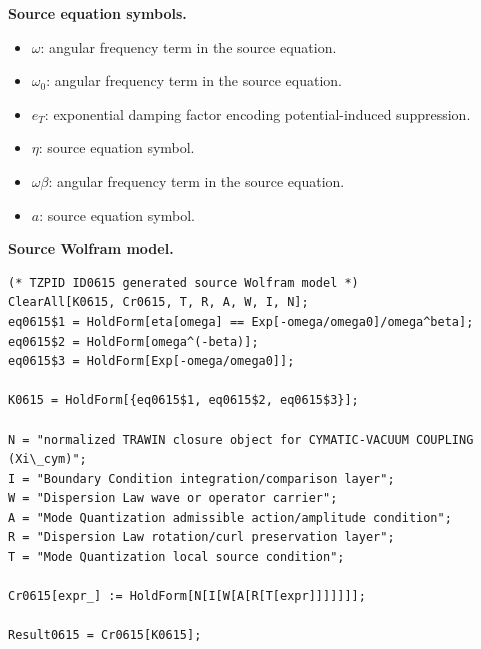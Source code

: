 \begin{minipage}[t]{0.49\linewidth}
\begingroup
\small
\raggedright
\textbf{Source equation symbols.}\par
\begin{itemize}[leftmargin=1.35em,itemsep=1pt,topsep=1pt,parsep=0pt]
    \item $\omega$: angular frequency term in the source equation.
    \item $\omega_0$: angular frequency term in the source equation.
    \item $e_T$: exponential damping factor encoding potential-induced suppression.
    \item $\eta$: source equation symbol.
    \item $\omega\beta$: angular frequency term in the source equation.
    \item $a$: source equation symbol.
\end{itemize}
\endgroup
\end{minipage}\hfill
\begin{minipage}[t]{0.47\linewidth}
\begingroup
\scriptsize
\raggedright
\textbf{Source Wolfram model.}\par
\begin{Verbatim}[fontsize=\tiny,breaklines=true,breakanywhere=true]
(* TZPID ID0615 generated source Wolfram model *)
ClearAll[K0615, Cr0615, T, R, A, W, I, N];
eq0615$1 = HoldForm[eta[omega] == Exp[-omega/omega0]/omega^beta];
eq0615$2 = HoldForm[omega^(-beta)];
eq0615$3 = HoldForm[Exp[-omega/omega0]];

K0615 = HoldForm[{eq0615$1, eq0615$2, eq0615$3}];

N = "normalized TRAWIN closure object for CYMATIC-VACUUM COUPLING (Xi\_cym)";
I = "Boundary Condition integration/comparison layer";
W = "Dispersion Law wave or operator carrier";
A = "Mode Quantization admissible action/amplitude condition";
R = "Dispersion Law rotation/curl preservation layer";
T = "Mode Quantization local source condition";

Cr0615[expr_] := HoldForm[N[I[W[A[R[T[expr]]]]]]];

Result0615 = Cr0615[K0615];
\end{Verbatim}
\endgroup
\end{minipage}

